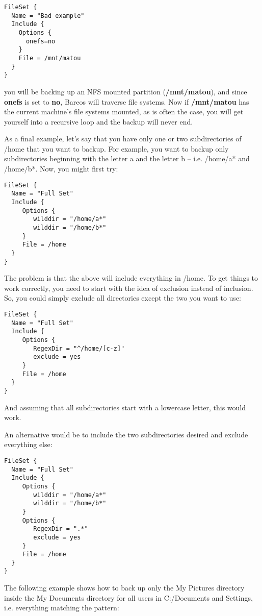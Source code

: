 \footnotesize
\begin{verbatim}
FileSet {
  Name = "Bad example"
  Include {
    Options {
      onefs=no
    }
    File = /mnt/matou
  }
}
\end{verbatim}
\normalsize

you will be backing up an NFS mounted partition ({\bf /mnt/matou}), and since
{\bf onefs} is set to {\bf no}, Bareos will traverse file systems. Now if {\bf
/mnt/matou} has the current machine's file systems mounted, as is often the
case, you will get yourself into a recursive loop and the backup will never
end.

As a final example, let's say that you have only one or two
subdirectories of /home that you want to backup.  For example,
you want to backup only subdirectories beginning with the letter
a and the letter b -- i.e. /home/a* and /home/b*.  Now, you might first
try:
\footnotesize
\begin{verbatim}
FileSet {
  Name = "Full Set"
  Include {
     Options {
        wilddir = "/home/a*"
        wilddir = "/home/b*"
     }
     File = /home
  }
}
\end{verbatim}
\normalsize

The problem is that the above will include everything in /home.  To get
things to work correctly, you need to start with the idea of exclusion
instead of inclusion.  So, you could simply exclude all directories
except the two you want to use:
\footnotesize
\begin{verbatim}
FileSet {
  Name = "Full Set"
  Include {
     Options {
        RegexDir = "^/home/[c-z]"
        exclude = yes
     }
     File = /home
  }
}
\end{verbatim}
\normalsize

And assuming that all subdirectories start with a lowercase letter, this
would work.

An alternative would be to include the two subdirectories desired and
exclude everything else:
\footnotesize
\begin{verbatim}
FileSet {
  Name = "Full Set"
  Include {
     Options {
        wilddir = "/home/a*"
        wilddir = "/home/b*"
     }
     Options {
        RegexDir = ".*"
        exclude = yes
     }
     File = /home
  }
}
\end{verbatim}
\normalsize


The following example shows how to back up only the My Pictures directory inside
the My Documents directory for all users in C:/Documents and Settings, i.e.
everything matching the pattern:

